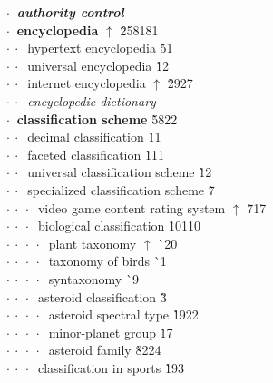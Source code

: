 \begin{tabbing}
$\cdot\:$  \textit{\textbf{authority control}}\\
$\cdot\:$  \textbf{encyclopedia} $\uparrow$ \` 258{\raisebox{.4\height}{\scalebox{.6}{+}}}181\\
$\cdot\:\cdot\:$  hypertext encyclopedia  \` 5{\raisebox{.4\height}{\scalebox{.6}{+}}}1\\
$\cdot\:\cdot\:$  universal encyclopedia  \` 1{\raisebox{.4\height}{\scalebox{.6}{+}}}2\\
$\cdot\:\cdot\:$  internet encyclopedia $\uparrow$ \` 29{\raisebox{.4\height}{\scalebox{.6}{+}}}27\\
$\cdot\:\cdot\:$  \textit{encyclopedic dictionary}\\
$\cdot\:$  \textbf{classification scheme}  \` 58{\raisebox{.4\height}{\scalebox{.6}{+}}}22\\
$\cdot\:\cdot\:$  decimal classification  \` 1{\raisebox{.4\height}{\scalebox{.6}{+}}}1\\
$\cdot\:\cdot\:$  faceted classification  \` 1{\raisebox{.4\height}{\scalebox{.6}{+}}}11\\
$\cdot\:\cdot\:$  universal classification scheme  \` 12\\
$\cdot\:\cdot\:$  specialized classification scheme  \` 7\\
$\cdot\:\cdot\:\cdot\:$  video game content rating system $\uparrow$ \` 7{\raisebox{.4\height}{\scalebox{.6}{+}}}17\\
$\cdot\:\cdot\:\cdot\:$  biological classification  \` 10{\raisebox{.4\height}{\scalebox{.6}{+}}}110\\
$\cdot\:\cdot\:\cdot\:\cdot\:$  plant taxonomy $\uparrow$ \` {\raisebox{.4\height}{\scalebox{.6}{+}}}20\\
$\cdot\:\cdot\:\cdot\:\cdot\:$  taxonomy of birds  \` {\raisebox{.4\height}{\scalebox{.6}{+}}}1\\
$\cdot\:\cdot\:\cdot\:\cdot\:$  syntaxonomy  \` {\raisebox{.4\height}{\scalebox{.6}{+}}}9\\
$\cdot\:\cdot\:\cdot\:$  asteroid classification  \` 3\\
$\cdot\:\cdot\:\cdot\:\cdot\:$  asteroid spectral type  \` 19{\raisebox{.4\height}{\scalebox{.6}{+}}}22\\
$\cdot\:\cdot\:\cdot\:\cdot\:$  minor-planet group  \` 1{\raisebox{.4\height}{\scalebox{.6}{+}}}7\\
$\cdot\:\cdot\:\cdot\:\cdot\:$  asteroid family  \` 82{\raisebox{.4\height}{\scalebox{.6}{+}}}24\\
$\cdot\:\cdot\:\cdot\:$  classification in sports  \` 19{\raisebox{.4\height}{\scalebox{.6}{+}}}3\\

\end{tabbing}
